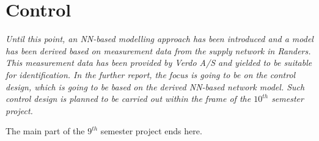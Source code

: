 \chapter{Control}
\label{unspecified}

\emph{Until this point, an NN-based modelling approach has been introduced and a model has been derived based on measurement data from the supply network in Randers. This measurement data has been provided by Verdo A/S and yielded to be suitable for identification. In the further report, the focus is going to be on the control design, which is going to be based on the derived NN-based network model. Such control design is planned to be carried out within the frame of the $10^{th}$ semester project.}

The main part of the $9^{th}$ semester project ends here. 